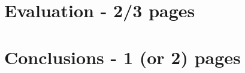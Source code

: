 \documentclass[12pt,a4paper]{article}
\begin{document}
\section{Evaluation - 2/3 pages}




\section{Conclusions - 1 (or 2) pages}




\end{document}
